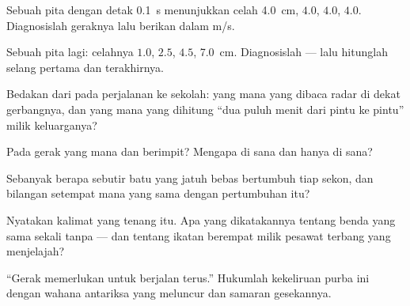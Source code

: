\begin{exercise}[$\star$]\label{exo:g9:uniform-varied-motion:2}
Sebuah pita dengan detak \qty{0.1}{s} menunjukkan celah
\qty{4.0}{cm}, $4.0$, $4.0$, $4.0$. Diagnosislah geraknya lalu berikan
 dalam \unit{m/s}.
\end{exercise}

\begin{exercise}[$\star$]\label{exo:g9:uniform-varied-motion:3}
Sebuah pita lagi: celahnya $1.0$, $2.5$, $4.5$, \qty{7.0}{cm}.
Diagnosislah --- lalu hitunglah  selang pertama dan
terakhirnya.
\end{exercise}

\begin{exercise}[$\star$]\label{exo:g9:uniform-varied-motion:4}
Bedakan  dari  pada perjalanan ke
sekolah: yang mana yang dibaca radar di dekat gerbangnya, dan yang mana
yang dihitung ``dua puluh menit dari pintu ke pintu'' milik
keluarganya?
\end{exercise}

\begin{exercise}[$\star$]\label{exo:g9:uniform-varied-motion:5}
Pada gerak yang mana  dan 
berimpit? Mengapa di sana dan hanya di sana?
\end{exercise}

\begin{exercise}[$\star$]\label{exo:g9:uniform-varied-motion:6}
Sebanyak berapa  sebutir batu yang jatuh bebas bertumbuh tiap
sekon, dan bilangan setempat mana yang sama dengan pertumbuhan itu?
\end{exercise}

\begin{exercise}[$\star$]\label{exo:g9:uniform-varied-motion:7}
Nyatakan kalimat yang tenang itu. Apa yang dikatakannya tentang benda
yang sama sekali tanpa  --- dan tentang ikatan berempat milik
pesawat terbang yang menjelajah?
\end{exercise}

\begin{exercise}[$\star$]\label{exo:g9:uniform-varied-motion:8}
``Gerak memerlukan  untuk berjalan terus.'' Hukumlah kekeliruan
purba ini dengan wahana antariksa yang meluncur dan samaran gesekannya.
\end{exercise}

